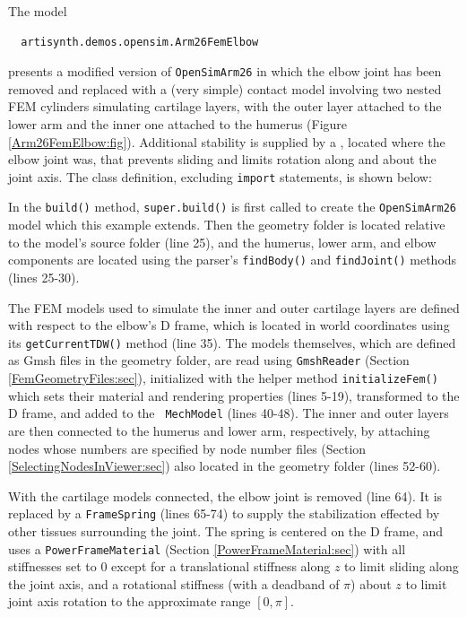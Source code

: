 The model 
\begin{verbatim}
  artisynth.demos.opensim.Arm26FemElbow
\end{verbatim}
presents a modified version of {\tt OpenSimArm26} in which the elbow joint has
been removed and replaced with a (very simple) contact model involving two
nested FEM cylinders simulating cartilage layers, with the outer layer
attached to the lower arm and the inner one attached to the humerus (Figure
\ref{Arm26FemElbow:fig}). Additional stability is supplied by a
, located where the elbow joint was, that
prevents sliding and limits rotation along and about the joint axis. The class
definition, excluding {\tt import} statements, is shown below:
%
\lstset{numbers=left} 
\iflatexml

\else

\fi
\lstset{numbers=none}
In the {\tt build()} method, {\tt super.build()} is first called to create the
{\tt OpenSimArm26} model which this example extends. Then the geometry folder is
located relative to the model's source folder (line 25), and the humerus, lower
arm, and elbow components are located using the parser's {\tt findBody()} and
{\tt findJoint()} methods (lines 25-30).

The FEM models used to simulate the inner and outer cartilage layers are
defined with respect to the elbow's D frame, which is located in world
coordinates using its {\tt getCurrentTDW()} method (line 35).  The models
themselves, which are defined as Gmsh files in the geometry folder, are read
using {\tt GmshReader} (Section \ref{FemGeometryFiles:sec}), initialized with
the helper method {\tt initializeFem()} which sets their material and rendering
properties (lines 5-19), transformed to the D frame, and added to the {\tt
MechModel} (lines 40-48). The inner and outer layers are then connected to the
humerus and lower arm, respectively, by attaching nodes whose numbers are
specified by node number files (Section \ref{SelectingNodesInViewer:sec})
also located in the geometry folder (lines 52-60).

With the cartilage models connected, the elbow joint is removed (line 64).  It
is replaced by a {\tt FrameSpring} (lines 65-74) to supply the stabilization
effected by other tissues surrounding the joint. The spring is centered on the
D frame, and uses a {\tt PowerFrameMaterial}
(Section \ref{PowerFrameMaterial:sec}) with all stiffnesses set to 0 except for
a translational stiffness along $z$ to limit sliding along the joint axis, and
a rotational stiffness (with a deadband of $\pi$) about $z$ to limit joint axis
rotation to the approximate range $[0, \pi]$.

